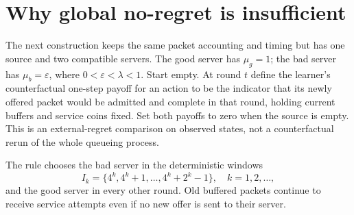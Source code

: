 \documentclass[11pt]{article}
\theoremstyle{definition}
\begin{document}
\section{Why global no-regret is insufficient}
The next construction keeps the same packet accounting and timing but has
one source and two compatible servers. The good server has $\mu_g=1$;
the bad server has $\mu_b=\varepsilon$, where
$0<\varepsilon<\lambda<1$. Start empty. At round $t$ define the learner's
counterfactual one-step payoff for an action to be the indicator that its
newly offered packet would be admitted and complete in that round,
holding current buffers and service coins fixed. Set both payoffs to zero
when the source is empty. This is an external-regret comparison on observed
states, not a counterfactual rerun of the whole queueing process.

The rule chooses the bad server in the deterministic windows
\[
 I_k=\{4^k,4^k+1,\ldots,4^k+2^k-1\},\quad k=1,2,\ldots,
\]
and the good server in every other round. Old buffered packets continue
to receive service attempts even if no new offer is sent to their server.
\end{document}
